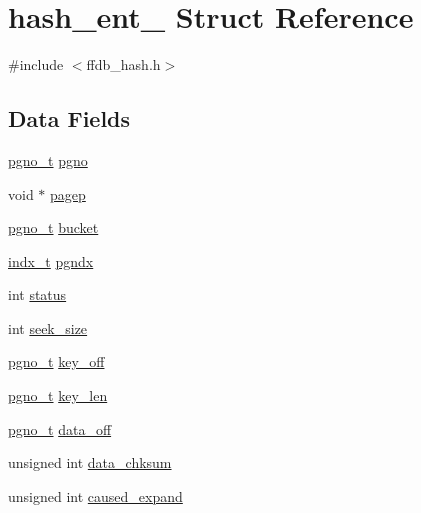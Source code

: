 \hypertarget{structhash__ent__}{}\section{hash\+\_\+ent\+\_\+ Struct Reference}
\label{structhash__ent__}


{\ttfamily \#include $<$ffdb\+\_\+hash.\+h$>$}

\subsection*{Data Fields}
\begin{DoxyCompactItemize}
\item 
\mbox{\hyperlink{adat-devel_2other__libs_2filedb_2filehash_2ffdb__db_8h_a000813331643d38481142bcce7de1501}{pgno\+\_\+t}} \mbox{\hyperlink{structhash__ent___a09aab3f7ff5db11d8f4207bb6b517d6f}{pgno}}
\item 
void $\ast$ \mbox{\hyperlink{structhash__ent___add14fc09a45d9e841b9112d77f5a57d7}{pagep}}
\item 
\mbox{\hyperlink{adat-devel_2other__libs_2filedb_2filehash_2ffdb__db_8h_a000813331643d38481142bcce7de1501}{pgno\+\_\+t}} \mbox{\hyperlink{structhash__ent___ae2b9802542ef673d965ee83cb4d755f2}{bucket}}
\item 
\mbox{\hyperlink{adat-devel_2other__libs_2filedb_2filehash_2ffdb__db_8h_a09ffd06672b99d3312cd7e19d4b05e45}{indx\+\_\+t}} \mbox{\hyperlink{structhash__ent___a6e6bafab03bc8626e663d23d0a99e70a}{pgndx}}
\item 
int \mbox{\hyperlink{structhash__ent___a5ee6daeaf6c53eace7610ddcad3da4d0}{status}}
\item 
int \mbox{\hyperlink{structhash__ent___a8fb6b4a631c3d7a65533740791b34432}{seek\+\_\+size}}
\item 
\mbox{\hyperlink{adat-devel_2other__libs_2filedb_2filehash_2ffdb__db_8h_a000813331643d38481142bcce7de1501}{pgno\+\_\+t}} \mbox{\hyperlink{structhash__ent___ae151d24ef5448238d539cd1afa313c02}{key\+\_\+off}}
\item 
\mbox{\hyperlink{adat-devel_2other__libs_2filedb_2filehash_2ffdb__db_8h_a000813331643d38481142bcce7de1501}{pgno\+\_\+t}} \mbox{\hyperlink{structhash__ent___a7be4f227a3491a44f7e643f0ca354393}{key\+\_\+len}}
\item 
\mbox{\hyperlink{adat-devel_2other__libs_2filedb_2filehash_2ffdb__db_8h_a000813331643d38481142bcce7de1501}{pgno\+\_\+t}} \mbox{\hyperlink{structhash__ent___aeddaa6eeb9c67da3640950876fa466ba}{data\+\_\+off}}
\item 
unsigned int \mbox{\hyperlink{structhash__ent___ac8938cc10c673879a50a0f291713683e}{data\+\_\+chksum}}
\item 
unsigned int \mbox{\hyperlink{structhash__ent___ad466c754efc662c05b8d952ec59314c7}{caused\+\_\+expand}}
\end{DoxyCompactItemize}


